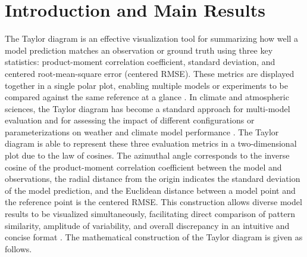 \documentclass{amsart}
\numberwithin{equation}{section}
\theoremstyle{plain}
\theoremstyle{definition}
\begin{document}
\maketitle

\section{Introduction and Main Results}

The Taylor diagram is an effective visualization tool for summarizing how well a model prediction matches an observation or ground truth using three key statistics: product-moment correlation coefficient, standard deviation, and centered root-mean-square error (centered RMSE). These metrics are displayed together in a single polar plot, enabling multiple models or experiments to be compared against the same reference at a glance \cite{taylor-2001}. 
In climate and atmospheric sciences, the Taylor diagram has become a standard approach for multi-model evaluation and for assessing the impact of different configurations or parameterizations on weather and climate model performance \cite{gleckler-2008, jiang-2012, khosravi-2025}. 
The Taylor diagram is able to represent these three evaluation metrics in a two-dimensional plot due to the law of cosines. 
The azimuthal angle corresponds to the inverse cosine of the product-moment correlation coefficient between the model and observations, the radial distance from the origin indicates the standard deviation of the model prediction, and the Euclidean distance between a model point and the reference point is the centered RMSE. 
This construction allows diverse model results to be visualized simultaneously, facilitating direct comparison of pattern similarity, amplitude of variability, and overall discrepancy in an intuitive and concise format \cite{taylor-2001}. 
The mathematical construction of the Taylor diagram is given as follows.
\end{document}
